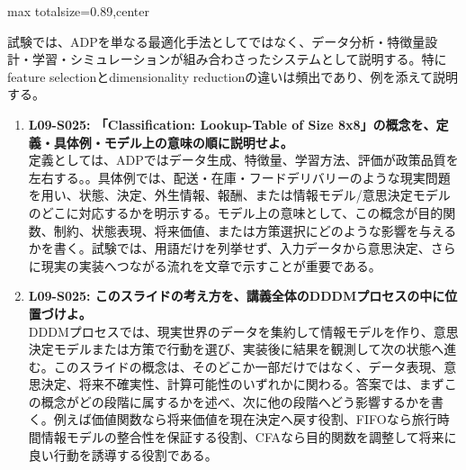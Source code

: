 \begin{minipage}[t]{0.58\textwidth}
\begin{adjustbox}{max totalsize={\textwidth}{0.89\textheight},center}
\begin{minipage}{\textwidth}
試験では、ADPを単なる最適化手法としてではなく、データ分析・特徴量設計・学習・シミュレーションが組み合わさったシステムとして説明する。特にfeature selectionとdimensionality reductionの違いは頻出であり、例を添えて説明する。\par{}\begin{enumerate}\item \textbf{L09-S025: 「Classification: Lookup-Table of Size 8x8」の概念を、定義・具体例・モデル上の意味の順に説明せよ。}\\定義としては、ADPではデータ生成、特徴量、学習方法、評価が政策品質を左右する。。具体例では、配送・在庫・フードデリバリーのような現実問題を用い、状態、決定、外生情報、報酬、または情報モデル/意思決定モデルのどこに対応するかを明示する。モデル上の意味として、この概念が目的関数、制約、状態表現、将来価値、または方策選択にどのような影響を与えるかを書く。試験では、用語だけを列挙せず、入力データから意思決定、さらに現実の実装へつながる流れを文章で示すことが重要である。\item \textbf{L09-S025: このスライドの考え方を、講義全体のDDDMプロセスの中に位置づけよ。}\\DDDMプロセスでは、現実世界のデータを集約して情報モデルを作り、意思決定モデルまたは方策で行動を選び、実装後に結果を観測して次の状態へ進む。このスライドの概念は、そのどこか一部だけではなく、データ表現、意思決定、将来不確実性、計算可能性のいずれかに関わる。答案では、まずこの概念がどの段階に属するかを述べ、次に他の段階へどう影響するかを書く。例えば価値関数なら将来価値を現在決定へ戻す役割、FIFOなら旅行時間情報モデルの整合性を保証する役割、CFAなら目的関数を調整して将来に良い行動を誘導する役割である。\end{enumerate}
\end{minipage}
\end{adjustbox}
\end{minipage}


